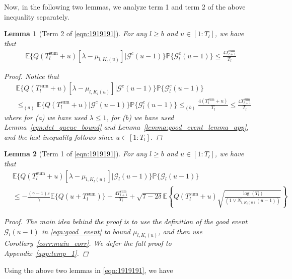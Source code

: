 \documentclass[12pt,draftcls, onecolumn]{IEEEtran}
\newtheorem{lemma}{Lemma}
\begin{document}
Now, in the following two lemmas, we analyze term 1 and term 2 of the above inequality separately.
\begin{lemma}[Term 2 of \eqref{eqn:1919191}]\label{lemma:term_2}
    For any $l \geq b$ and $u \in [1:T_l]$, we have that
    \begin{align}
         \mathbb{E}\{Q(T^{\text{sum}}_l+u)[\lambda - \mu_{l,K_l(u)}]|\mathcal{G}^c(u-1)\}\mathbb{P}\{\mathcal{G}_l^c(u-1)\}  \leq  \frac{4T^{\text{sum}}_{l+1}}{T_l} \nonumber
    \end{align}
    \begin{proof}
        Notice that
        \begin{align}
            &\mathbb{E}\{Q(T^{\text{sum}}_l+u)[\lambda - \mu_{l,K_l(u)}]|\mathcal{G}^c(u-1)\}\mathbb{P}\{\mathcal{G}_l^c(u-1)\} \nonumber\\& \leq_{(a)} \mathbb{E}\{Q(T^{\text{sum}}_l+u)|\mathcal{G}^c(u-1)\}\mathbb{P}\{\mathcal{G}_l^c(u-1)\} \leq_{(b)} \frac{4(T^{\text{sum}}_l+u)}{T_l}\leq \frac{4T^{\text{sum}}_{l+1}}{T_l} \nonumber
        \end{align}
        where for (a) we have used $\lambda \leq 1$, for (b) we have used Lemma~\ref{eqn:det_queue_bound} and Lemma~\ref{lemma:good_event_lemma_app}, and the last inequality follows since $u \in [1:T_l]$.
    \end{proof}
\end{lemma}
\begin{lemma}[Term 1 of \eqref{eqn:1919191}]\label{lemma:temp_1}
   For any $l \geq b$ and $u \in [1:T_l]$, we have that
    \begin{align}
       & \mathbb{E}\{Q(T^{\text{sum}}_l+u)[\lambda - \mu_{l,K_l(u)}]|\mathcal{G}_l(u-1)\}\mathbb{P}\{\mathcal{G}_{l}(u-1)\} \nonumber\\& \leq    -\frac{(\gamma-1)\varepsilon}{\gamma}\mathbb{E}\{Q(u+T^{\text{sum}}_l)\}+\frac{4T^{\text{sum}}_{l+1}}{ T_l}+  \sqrt{7-2\delta}\mathbb{E}\left\{Q(T^{\text{sum}}_l+u)\sqrt{\frac{\log\left(T_l\right)}{(1 \vee N_{l,K_l(u)}(u-1))}}\right\} \nonumber
    \end{align}
    \begin{proof}
The main idea behind the proof is to use the definition of the good event $\mathcal{G}_l(u-1)$ in \eqref{eqn:good_event} to bound $\mu_{l,K_l(u)}$, and then use Corollary~\ref{corr:main_corr}. We defer the full proof to Appendix~\ref{app:temp_1}.
    \end{proof}
\end{lemma}
Using the above two lemmas in \eqref{eqn:1919191}, we have
\end{document}
